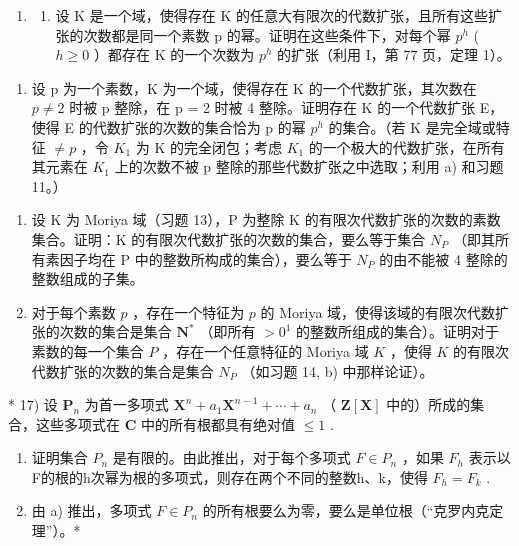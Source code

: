 \begin{enumerate}
\def\labelenumi{\arabic{enumi})}
\setcounter{enumi}{13}
\tightlist
\item
  \begin{enumerate}
  \def\labelenumii{\alph{enumii})}
  \tightlist
  \item
    设 K 是一个域，使得存在 K 的任意大有限次的代数扩张，且所有这些扩张的次数都是同一个素数 p 的幂。证明在这些条件下，对每个幂 \(p^{h}\) ( \(h \geqslant 0\) ）都存在 K 的一个次数为 \(p^{h}\) 的扩张（利用 I，第 77 页，定理 1）。
  \end{enumerate}
\end{enumerate}

\begin{enumerate}
\def\labelenumi{\alph{enumi})}
\setcounter{enumi}{1}
\tightlist
\item
  设 p 为一个素数，K 为一个域，使得存在 K 的一个代数扩张，其次数在 \(p \neq 2\) 时被 p 整除，在 p = 2 时被 4 整除。证明存在 K 的一个代数扩张 E，使得 E 的代数扩张的次数的集合恰为 p 的幂 \(p^{h}\) 的集合。（若 K 是完全域或特征 \(\neq p\) ，令 \(K_{1}\) 为 K 的完全闭包；考虑 \(K_{1}\) 的一个极大的代数扩张，在所有其元素在 \(K_{1}\) 上的次数不被 p 整除的那些代数扩张之中选取；利用 a) 和习题 11。）
\end{enumerate}

\begin{enumerate}
\def\labelenumi{\arabic{enumi})}
\setcounter{enumi}{14}
\item
  设 K 为 Moriya 域（习题 13），P 为整除 K 的有限次代数扩张的次数的素数集合。证明：K 的有限次代数扩张的次数的集合，要么等于集合 \(N_{P}\) （即其所有素因子均在 P 中的整数所构成的集合），要么等于 \(N_{P}\) 的由不能被 4 整除的整数组成的子集。
\item
  对于每个素数 \(p\) ，存在一个特征为 \(p\) 的 Moriya 域，使得该域的有限次代数扩张的次数的集合是集合 \(\mathbf{N}^*\) （即所有 \(>0^1\) 的整数所组成的集合）。证明对于素数的每一个集合 \(P\) ，存在一个任意特征的 Moriya 域 \(K\) ，使得 \(K\) 的有限次代数扩张的次数的集合是集合 \(N_P\) （如习题 14, b) 中那样论证）。
\end{enumerate}

* 17) 设 \(\mathbf{P}_n\) 为首一多项式 \(\mathbf{X}^n + a_1\mathbf{X}^{n-1} + \cdots + a_n\) （ \(\mathbf{Z}[\mathbf{X}]\) 中的）所成的集合，这些多项式在 \(\mathbf{C}\) 中的所有根都具有绝对值 \(\leqslant 1\) .

\begin{enumerate}
\def\labelenumi{\alph{enumi})}
\item
  证明集合 \(P_{n}\) 是有限的。由此推出，对于每个多项式 \(F \in P_{n}\) ，如果 \(F_{h}\) 表示以F的根的h次幂为根的多项式，则存在两个不同的整数h、k，使得 \(F_{h} = F_{k}\) .
\item
  由 a) 推出，多项式 \(F \in P_{n}\) 的所有根要么为零，要么是单位根（“克罗内克定理”）。*
\end{enumerate}

